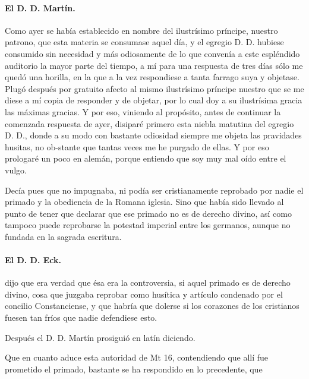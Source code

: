 \paragraph*{El D. D. Martín.}

Como ayer se había establecido en nombre del ilustrísimo príncipe, nuestro patrono, que esta materia se consumase aquel día, y el egregio D. D. hubiese consumido sin necesidad y más odiosamente de lo que convenía a este espléndido auditorio la mayor parte del tiempo, a mí para una respuesta de tres días sólo me quedó una horilla, en la que a la vez respondiese a tanta farrago suya y objetase. Plugó después por gratuito afecto al mismo ilustrísimo príncipe nuestro que se me diese a mí copia de responder y de objetar, por lo cual doy a su ilustrísima gracia las máximas gracias. Y por eso, viniendo al propósito, antes de continuar la comenzada respuesta de ayer, disiparé primero esta niebla matutina del egregio D. D., donde a su modo con bastante odiosidad siempre me objeta las pravidades husitas, no ob-\marginpar{\small[299]}stante que tantas veces me he purgado de ellas. Y por eso prologaré un poco en alemán, porque entiendo que soy muy mal oído entre el vulgo.

Decía pues que no impugnaba, ni podía ser cristianamente reprobado por nadie el primado y la obediencia de la Romana iglesia. Sino que había sido llevado al punto de tener que declarar que ese primado no es de derecho divino, así como tampoco puede reprobarse la potestad imperial entre los germanos, aunque no fundada en la sagrada escritura.

\paragraph*{El D. D. Eck.}

dijo que era verdad que ésa era la controversia, si aquel primado es de derecho divino, cosa que juzgaba reprobar como husítica y artículo condenado por el concilio Constanciense, y que habría que dolerse si los corazones de los cristianos fuesen tan fríos que nadie defendiese esto.

Después el D. D. Martín prosiguió en latín diciendo.

Que en cuanto aduce esta autoridad de Mt 16, contendiendo que allí fue prometido el primado, bastante se ha respondido en lo precedente, que

